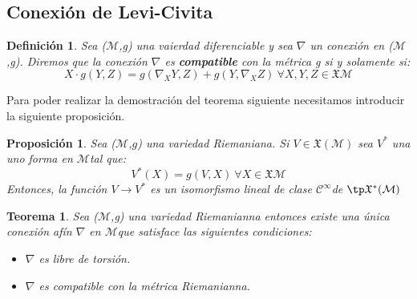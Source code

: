 \documentclass[pdftex,11pt,a4paper]{book}
\newtheorem{defi}{Definici\'on}
\newtheorem{teo}{Teorema}
\newtheorem{propo}{Proposición}
\newcommand{\M}{$\mathscr{M}$}
\newcommand{\Cinf}{ $\mathscr{C}^\infty$}
\newcommand{\XM}{\mathfrak{X}\mathcal{M} }
\begin{document}
\subsection{Conexión de Levi-Civita}
\begin{defi}
Sea (\M,g) una vaierdad diferenciable y sea $\nabla$ un conexión en (\M,g). Diremos que la conexión $\nabla$ es \textbf{compatible} con la métrica g si y solamente si: 
\begin{equation}
    X\cdot g(Y,Z)=g(\nabla_X Y,Z)+g(Y, \nabla_X Z) \ \forall X,Y,Z \in \XM
\end{equation}
\end{defi}
Para poder realizar la demostración del teorema siguiente necesitamos introducir la siguiente proposición.
\begin{propo}
Sea (\M,$g$) una variedad Riemaniana. Si $V \in \mathfrak{X}(\mathscr{M})$ sea $V^*$ una uno forma en \M tal que: 
\begin{equation*}
    V^*(X)=g(V,X) \ \forall X \in \XM
\end{equation*}
Entonces, la función $V \to V^*$ es un isomorfismo lineal de clase \Cinf de \MX  $\tp \mathfrak{X}^*(\mathcal{M})$
\end{propo}
\begin{teo}
Sea (\M,g) una variedad Riemanianna entonces existe una única conexión afín $\nabla$  en \M que satisface las siguientes condiciones:
\begin{itemize}
    \item $\nabla$ es libre de torsión.
    \item $\nabla$ es compatible con la métrica Riemanianna.\cite{boothby}
\end{itemize}
\end{teo}
\end{document}
